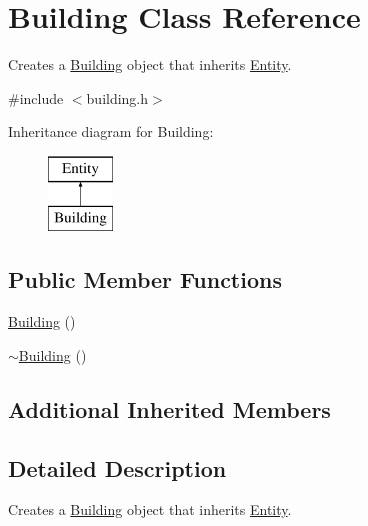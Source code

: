 \hypertarget{class_building}{\section{Building Class Reference}
\label{class_building}
}


Creates a \hyperlink{class_building}{Building} object that inherits \hyperlink{class_entity}{Entity}.  




{\ttfamily \#include $<$building.\+h$>$}

Inheritance diagram for Building\+:\begin{figure}[H]
\begin{center}
\leavevmode
\includegraphics[height=2.000000cm]{class_building}
\end{center}
\end{figure}
\subsection*{Public Member Functions}
\begin{DoxyCompactItemize}
\item 
\hyperlink{class_building_ab570ec0a203ee621f9f522c678a147d9}{Building} ()
\item 
\hyperlink{class_building_ab675c6a382e110b84031956cda708439}{$\sim$\+Building} ()
\end{DoxyCompactItemize}
\subsection*{Additional Inherited Members}


\subsection{Detailed Description}
Creates a \hyperlink{class_building}{Building} object that inherits \hyperlink{class_entity}{Entity}. 

